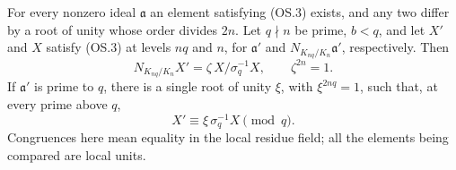 \begin{proposition}
For every nonzero ideal $\mathfrak a$ an element satisfying (OS.3)
exists, and any two differ by a root of unity whose order divides $2n$.
Let $q\nmid n$ be prime, $b<q$, and let $X'$ and $X$ satisfy (OS.3)
at levels $nq$ and $n$, for $\mathfrak a'$ and
$N_{K_{nq}/K_n}\mathfrak a'$, respectively.  Then
\[
 N_{K_{nq}/K_n}X'
   =\zeta\,X/\sigma_q^{-1}X,\qquad \zeta^{2n}=1.
 \tag{OS.4}
\]
If $\mathfrak a'$ is prime to $q$, there is a single root of unity
$\xi$, with $\xi^{2nq}=1$, such that, at every prime above $q$,
\[
                  X'\equiv\xi\,\sigma_q^{-1}X\pmod q.
 \tag{OS.5}
\]
Congruences here mean equality in the local residue field; all the
elements being compared are local units.
\end{proposition}
